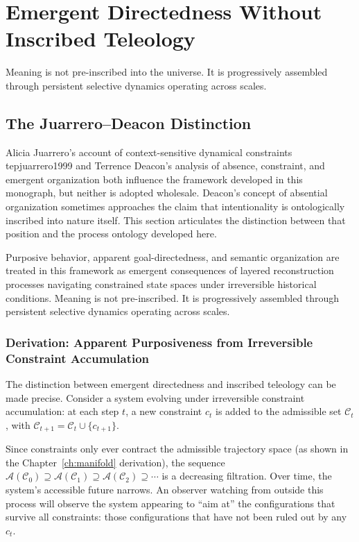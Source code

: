 \chapter{Emergent Directedness Without Inscribed Teleology}
\label{ch:conclusion}

\epigraph{Meaning is not pre-inscribed into the universe. It is progressively
assembled through persistent selective dynamics operating across scales.}{}

\section{The Juarrero--Deacon Distinction}

Alicia Juarrero's account of context-sensitive dynamical constraints 	tep{juarrero1999} and Terrence
Deacon's analysis of absence, constraint, and emergent organization both influence
the framework developed in this monograph, but neither is adopted wholesale.
Deacon's concept of absential organization sometimes approaches the claim that
intentionality is ontologically inscribed into nature itself. This section
articulates the distinction between that position and the process ontology
developed here.

Purposive behavior, apparent goal-directedness, and semantic organization are
treated in this framework as emergent consequences of layered reconstruction
processes navigating constrained state spaces under irreversible historical
conditions. Meaning is not pre-inscribed. It is progressively assembled through
persistent selective dynamics operating across scales.

\subsection*{Derivation: Apparent Purposiveness from Irreversible Constraint Accumulation}

The distinction between emergent directedness and inscribed teleology can be made
precise. Consider a system evolving under irreversible constraint accumulation:
at each step $t$, a new constraint $c_t$ is added to the admissible set
$\mathcal{C}_t$, with $\mathcal{C}_{t+1} = \mathcal{C}_t \cup \{c_{t+1}\}$.

Since constraints only ever contract the admissible trajectory space (as shown in
the Chapter~\ref{ch:manifold} derivation), the sequence
$\mathcal{A}(\mathcal{C}_0) \supseteq \mathcal{A}(\mathcal{C}_1) \supseteq
\mathcal{A}(\mathcal{C}_2) \supseteq \cdots$ is a decreasing filtration. Over
time, the system's accessible future narrows. An observer watching from outside
this process will observe the system appearing to ``aim at'' the configurations
that survive all constraints: those configurations that have not been ruled out
by any $c_t$.

